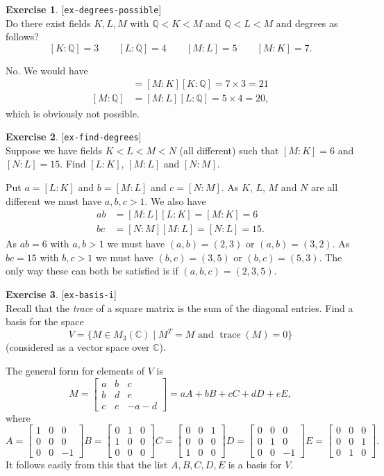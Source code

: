 \documentclass{amsart}
\newcommand{\trc}	{\operatorname{trace}}
\newcommand{\Q}         {{\mathbb{Q}}}
\newcommand{\C}         {{\mathbb{C}}}
\newcommand{\bsm}       {\left[\begin{smallmatrix}}
\newcommand{\esm}       {\end{smallmatrix}\right]}
\newcommand{\st}        {\;|\;}
\newcommand{\tm}        {\times}
\renewcommand{\:}{\colon}
\newcommand{\lastexlabel}{}
\newcommand{\exlabel}[1]{
 \global\def\lastexlabel{#1}\label{#1}[\texttt{#1}]\ \\
}
\newcommand{\exlabel}[1]{
 \global\def\lastexlabel{#1}\label{#1}
}
\newenvironment{solution}{\SolutionInline}{\endSolutionInline}
\theoremstyle{definition}
\newtheorem{exercise}{Exercise}[section]
\renewenvironment{solution}{\SolutionAtEnd}{\endSolutionAtEnd}
\begin{document}
\begin{exercise}\exlabel{ex-degrees-possible}
 Do there exist fields $K,L,M$ with $\Q<K<M$ and $\Q<L<M$ and degrees
 as follows?
 \[ [K:\Q] = 3 \qquad [L:\Q] = 4 \qquad
    [M:L] = 5 \qquad [M:K] = 7.
 \]
\end{exercise}
\begin{solution}
 No.  We would have
 \begin{align*}
  [M:\Q] &= [M:K][K:\Q] = 7\tm 3 = 21 \\
  [M:\Q] &= [M:L][L:\Q] = 5\tm 4 = 20,
 \end{align*}
 which is obviously not possible.
\end{solution}

\begin{exercise}\exlabel{ex-find-degrees}
 Suppose we have fields $K<L<M<N$ (all different) such that $[M:K]=6$
 and $[N:L]=15$.  Find $[L:K]$, $[M:L]$ and $[N:M]$.
\end{exercise}
\begin{solution}
 Put $a=[L:K]$ and $b=[M:L]$ and $c=[N:M]$.  As $K$, $L$, $M$ and $N$
 are all different we must have $a,b,c>1$.  We also have
 \begin{align*}
  ab &= [M:L][L:K] = [M:K] = 6 \\
  bc &= [N:M][M:L] = [N:L] = 15.
 \end{align*}
 As $ab=6$ with $a,b>1$ we must have $(a,b)=(2,3)$ or $(a,b)=(3,2)$.
 As $bc=15$ with $b,c>1$ we must have $(b,c)=(3,5)$ or $(b,c)=(5,3)$.
 The only way these can both be satisfied is if $(a,b,c)=(2,3,5)$.
\end{solution}

\begin{exercise}\exlabel{ex-basis-i}
 Recall that the \emph{trace} of a square matrix is the sum of the
 diagonal entries.  Find a basis for the space 
 \[ V = \{M\in M_3(\C)\st M^T=M \text{ and } \trc(M)=0\} \]
 (considered as a vector space over $\C$).
\end{exercise}
\begin{solution}
 The general form for elements of $V$ is
 \[ M = \bsm a & b & c \\ b & d & e \\ c & e & -a-d \esm =
     aA+bB+cC+dD+eE,
 \]
 where 
 \[ A = \bsm 1&0&0\\ 0&0&0\\ 0&0&-1 \esm
    B = \bsm 0&1&0\\ 1&0&0\\ 0&0&0 \esm 
    C = \bsm 0&0&1\\ 0&0&0\\ 1&0&0 \esm 
    D = \bsm 0&0&0\\ 0&1&0\\ 0&0&-1 \esm
    E = \bsm 0&0&0\\ 0&0&1\\ 0&1&0 \esm.
 \]
 It follows easily from this that the list $A,B,C,D,E$ is a basis for
 $V$. 
\end{solution}
\end{document}
